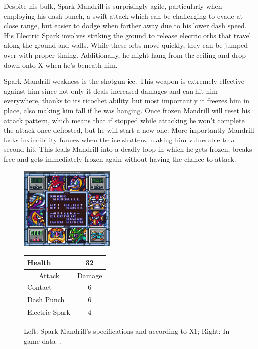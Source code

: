 Despite his bulk, Spark Mandrill is surprisingly agile, particularly when employing his dash punch, a swift attack which can be challenging to evade at close range, but easier to dodge when farther away due to his lower dash speed. His Electric Spark involves striking the ground to release electric orbs that travel along the ground and walls. While these orbs move quickly, they can be jumped over with proper timing. Additionally, he might hang from the ceiling and drop down onto X when he's beneath him. 

Spark Mandrill weakness is the shotgun ice. This weapon is extremely effective against him since not only it deals increased damages and can hit him everywhere, thanks to its ricochet ability, but most importantly it freezes him in place, also making him fall if he was hanging. Once frozen Mandrill will reset his attack pattern, which means that if stopped while attacking he won't complete the attack once defrosted, but he will start a new one. More importantly Mandrill lacks invincibility frames when the ice shatters, making him vulnerable to a second hit. This leads Mandrill into a deadly loop in which he gets frozen, breaks free and gets immediately frozen again without having the chance to attack.\begin{figure}[htp]
	\begin{minipage}[c]{0.45\linewidth}
		\vspace{0pt}
		\centering
		\includegraphics[height=4cm]{figures/X1/Spark_mandrill/Spark_mandril_specs.png}
	\end{minipage}
	\begin{minipage}[c]{0.45\linewidth}
		\centering
		\vspace{0pt}
		\begin{tabular}[h]{l c}
			\toprule
			Health  & 32\\
			\midrule
			\multicolumn{1}{c}{Attack} & \multicolumn{1}{c}{Damage}\\
			Contact & 6\\
			Dash Punch& 6\\
			Electric Spark & 4\\
			\bottomrule
		\end{tabular}
	\end{minipage}
	\caption{Left: Spark Mandrill's specifications and according to X1; Right: In-game data~\cite{wiki:Spark_mandrill}. }
	\label{Mandrill_specs}
\end{figure}
